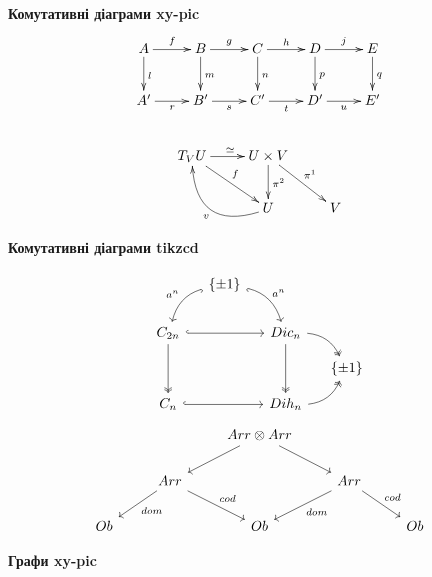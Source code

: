\documentclass[14pt]{extarticle}
\begin{document}
    \textbf{Комутативні діаграми xy-pic}
    \begin{gather*}
        \xymatrix{
            A \ar[r]^{f} \ar[d]^{l} & B \ar[r]^{g} \ar[d]^{m} & C \ar[r]^{h} \ar[d]^{n} & D \ar[r]^{j} \ar[d]^{p} & E \ar[d]^{q} \\
            A' \ar[r]_{r} & B' \ar[r]_{s} & C' \ar[r]_{t} & D' \ar[r]_{u} & E' \\
        } \\
        \hspace{5cm} \\
        \xymatrix{
            T_V U \ar[r]^{\simeq} \ar[rd]^{f} & U \times V \ar[d]^{\pi ^ 2} \ar[rd]^{\pi ^ 1} \\
            & U \ar@/^{2pc}/[ul]^{v} & V
        }\\
    \end{gather*}

    \textbf{Комутативні діаграми tikzcd}

    \[
        \begin{tikzcd}[column sep=small,row sep=small]
            & \{\pm 1\} \arrow[hook,bend right,swap]{ldd}{a ^ n} \arrow[hook',bend left]{rdd}{a ^ n} \\
            & & & \\
            C_{2 n} \arrow[hook]{rr} \arrow[two heads]{dd} & & Dic_n \arrow[two heads]{dd} \arrow[bend left,two heads]{rd} \\
            & & & \{\pm 1\} \\
            C_n \arrow[hook]{rr} & & Dih_n \arrow[bend right,two heads]{ru}
        \end{tikzcd}
    \]
    \[
        \begin{tikzcd}
            & & Arr \otimes Arr \arrow{ld} \arrow{rd} \\
            & Arr \arrow{ld}{dom} \arrow{rd}{cod} & & Arr \arrow{ld}{dom} \arrow{rd}{cod} \\
            Ob & & Ob & & Ob
        \end{tikzcd}
    \]

    \newpage

    \textbf{Графи xy-pic}
\end{document}
